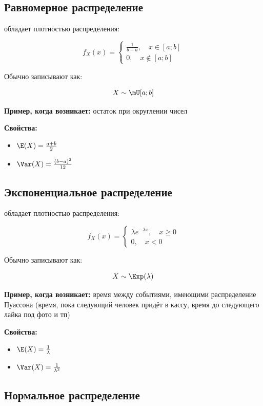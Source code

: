 \documentclass[12pt, a4paper, oneside]{article}
\begin{document}
\subsection*{Равномерное распределение}

 обладает плотностью распределения: 

$$
f_X(x) =\begin{cases}
\frac{1}{b - a}, \quad x \in [a; b]  \\
0, \quad x \notin [a; b]
\end{cases}
$$

Обычно записывают как:

$$
X \sim \mU[a; b]
$$

\textbf{Пример, когда возникает:} остаток при округлении чисел

\textbf{Свойства:}

\begin{itemize} 
\item $\E(X) = \frac{a + b}{2}$
\item $\Var(X) = \frac{(b - a)^2}{12}$
\end{itemize} 


\subsection*{Экспоненциальное распределение}

 обладает плотностью распределения: 

$$
f_X(x) =\begin{cases}
\lambda e^{- \lambda x}, \quad x \ge 0  \\
0, \quad x < 0
\end{cases}
$$

Обычно записывают как:

$$
X \sim \Exp(\lambda)
$$

\textbf{Пример, когда возникает:} время между событиями, имеющими распределение Пуассона (время, пока следующий человек придёт в кассу, время до следующего лайка под фото и тп)

\textbf{Свойства:}

\begin{itemize} 
\item $\E(X) = \frac{1}{\lambda}$
\item $\Var(X) = \frac{1}{\lambda^2}$
\end{itemize} 

\subsection*{Нормальное распределение}
\end{document}
